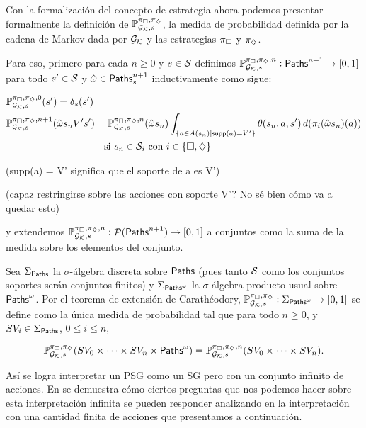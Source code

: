 \begin{boxamarillo}{}
	Con la formalización del concepto de estrategia ahora podemos presentar
	formalmente la definición de $\mathbb{P}_{\mathcal{G}_{\mathcal{K}}, s}^{\pi_\square, \pi_\diamondsuit}$, la medida de probabilidad definida por
	la cadena de Markov dada por $\mathcal{G}_{\mathcal{K}}$ y las estrategias $\pi_\square$ y $\pi_\diamondsuit$.

	Para eso, primero para cada $n \geq 0$ y $s \in \mathcal{S}$ definimos $\mathbb{P}^{\pi_\square,
			\pi_\diamondsuit, n}_{\mathcal{G}_{\mathcal{K}}, s} : \textsf{Paths}^{n+1} \rightarrow [0, 1]$ para todo $s' \in \mathcal{S}$
	y $\hat{\omega} \in \textsf{Paths}_s^{n+1}$ inductivamente como sigue:

	\begin{align*}
		&\mathbb{P}^{\pi_\square, \pi_\diamondsuit, 0}_{\mathcal{G}_{\mathcal{K}}, s}(s') = \delta_s(s') \\
		&\mathbb{P}^{\pi_\square, \pi_\diamondsuit, n+1}_{\mathcal{G}_{\mathcal{K}}, s}(\hat{\omega}s_nV's') = \mathbb{P}^{\pi_\square, \pi_\diamondsuit, n}_{\mathcal{G}_{\mathcal{K}}, s}(\hat{\omega} s_n) \int_{\{ a \in A(s_n) \mid \textsf{supp}(a) = V'\}} \theta(s_n, a, s') \, d(\pi_i(\hat{\omega}s_n)(a)) \\ & \qquad \qquad \qquad \qquad \qquad \text{si } s_n \in \mathcal{S}_i \text{ con } i \in \{\square, \diamondsuit\}
	\end{align*}

	(supp(a) = V' significa que el soporte de a es V')

	(capaz restringirse sobre las acciones con soporte V'? No sé bien cómo va a quedar esto)

	y extendemos \( \mathbb{P}^{\pi_\square, \pi_\diamondsuit, n}_{\mathcal{G}_{\mathcal{K}}, s} :
	\mathcal{P}(\textsf{Paths}^{n+1}) \to [0, 1] \) a conjuntos como la suma de la medida
	sobre los elementos del conjunto.

	Sea \( \Sigma_{\textsf{Paths}} \) la \( \sigma \)-álgebra discreta sobre \( \textsf{Paths} \)
	(pues tanto $\mathcal{S}$ como los conjuntos soportes serán conjuntos finitos) y \(
	\Sigma_{\textsf{Paths}^\omega} \) la \( \sigma \)-álgebra producto usual sobre \(
	\textsf{Paths}^\omega \). Por el teorema de extensión de Carathéodory, \(
	\mathbb{P}^{\pi_\square, \pi_\diamondsuit}_{\mathcal{G}_{\mathcal{K}}, s} : \Sigma_{\textsf{Paths}^\omega} \to [0, 1] \) se
	define como la única medida de probabilidad tal que para todo \( n \geq 0 \), y
	\( SV_i \in \Sigma_{\textsf{Paths}} \), \( 0 \leq i \leq n \),

	\[
		\mathbb{P}^{\pi_\square, \pi_\diamondsuit}_{\mathcal{G}_{\mathcal{K}}, s}(SV_0 \times \dots \times SV_n \times \textsf{Paths}^\omega) = \mathbb{P}^{\pi_\square, \pi_\diamondsuit, n}_{\mathcal{G}_{\mathcal{K}}, s}(SV_0 \times \dots \times SV_n).
	\]
\end{boxamarillo}

Así se logra interpretar un PSG como un SG pero con un conjunto infinito de
acciones. 
En \cite{Polytopal} se demuestra cómo ciertos preguntas que nos podemos hacer
sobre esta interpretación infinita se pueden responder analizando en la
interpretación con una cantidad finita de acciones que presentamos a
continuación.

